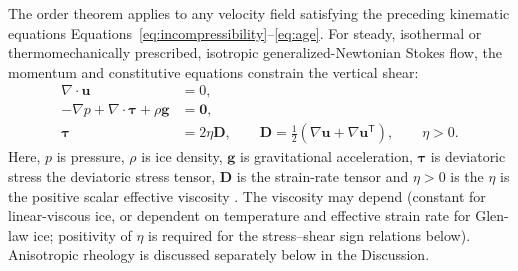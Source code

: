 \documentclass[review]{igs}
\providecommand{\DIFadd}[1]{{\protect\color{blue} \sf #1}} %
\providecommand{\DIFdel}[1]{{\protect\color{red} \scriptsize #1}} %
\providecommand{\DIFaddbegin}{} %
\providecommand{\DIFaddend}{} %
\providecommand{\DIFdelbegin}{} %
\providecommand{\DIFdelend}{} %
\newcommand{\DIFscaledelfig}{0.5}
\newlength{\DIFdelgraphicswidth} %
\newlength{\DIFdelgraphicsheight} %
\newcommand{\DIFaddincludegraphics}[2][]{{\color{blue}\fbox{\DIFOincludegraphics[#1]{#2}}}} %
\newcommand{\DIFdelincludegraphics}[2][]{%
\sbox{\DIFdelgraphicsbox}{\DIFOincludegraphics[#1]{#2}}%
\settoboxwidth{\DIFdelgraphicswidth}{\DIFdelgraphicsbox} %
\settoboxtotalheight{\DIFdelgraphicsheight}{\DIFdelgraphicsbox} %
\scalebox{\DIFscaledelfig}{%
\parbox[b]{\DIFdelgraphicswidth}{\usebox{\DIFdelgraphicsbox}\\[-\baselineskip] \rule{\DIFdelgraphicswidth}{0em}}\llap{\resizebox{\DIFdelgraphicswidth}{\DIFdelgraphicsheight}{%
\setlength{\unitlength}{\DIFdelgraphicswidth}%
\begin{picture}(1,1)%
\thicklines\linethickness{2pt} %
{\color[rgb]{1,0,0}\put(0,0){\framebox(1,1){}}}%
{\color[rgb]{1,0,0}\put(0,0){\line( 1,1){1}}}%
{\color[rgb]{1,0,0}\put(0,1){\line(1,-1){1}}}%
\end{picture}%
}\hspace*{3pt}}} %
} %
\DeclareRobustCommand{\DIFaddbegin}{\DIFOaddbegin \let\includegraphics\DIFaddincludegraphics} %
\DeclareRobustCommand{\DIFaddend}{\DIFOaddend \let\includegraphics\DIFOincludegraphics} %
\DeclareRobustCommand{\DIFdelbegin}{\DIFOdelbegin \let\includegraphics\DIFdelincludegraphics} %
\DeclareRobustCommand{\DIFdelend}{\DIFOaddend \let\includegraphics\DIFOincludegraphics} %
\begin{document}
The order theorem applies to any velocity field satisfying \DIFdelbegin \DIFdel{the preceding kinematic equations}\DIFdelend \DIFaddbegin \DIFadd{Equations~\ref{eq:incompressibility}--\ref{eq:age}}\DIFaddend . For steady, isothermal or thermomechanically prescribed, isotropic generalized-Newtonian Stokes flow, the momentum and constitutive equations constrain the vertical shear:
\begin{align}
\nabla\cdot\bm{u}&=0,
\label{eq:mass}\\
-\nabla p+\nabla\cdot\bm{\tau}+\rho\bm{g}&=\bm{0},
\label{eq:momentum}\\
\bm{\tau}&=2\eta\bm{D},
\qquad
\bm{D}=\tfrac12\left(\nabla\bm{u}+\nabla\bm{u}^{\mathsf T}\right),
\qquad \eta>0.
\label{eq:rheology}
\end{align}
Here, \(p\) is pressure, \(\rho\) is ice density, \(\bm{g}\) is gravitational acceleration, \(\bm{\tau}\) is \DIFdelbegin \DIFdel{deviatoric stress}\DIFdelend \DIFaddbegin \DIFadd{the deviatoric stress tensor}\DIFaddend , \(\bm{D}\) is the strain-rate tensor and \DIFdelbegin \DIFdel{\(\eta>0\) is the }\DIFdelend \DIFaddbegin \DIFadd{\(\eta\) is the positive }\DIFaddend scalar effective viscosity \DIFdelbegin \DIFdel{. The viscosity may depend }\DIFdelend \DIFaddbegin \DIFadd{(constant for linear-viscous ice, or dependent }\DIFaddend on temperature and effective strain rate \DIFaddbegin \DIFadd{for Glen-law ice; positivity of \(\eta\) is required for the stress--shear sign relations below)}\DIFaddend . Anisotropic rheology is discussed \DIFdelbegin \DIFdel{separately below}\DIFdelend \DIFaddbegin \DIFadd{in the Discussion}\DIFaddend .
\end{document}
